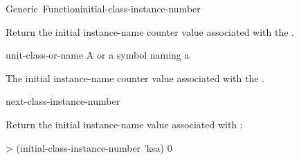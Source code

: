 \documentclass[10pt,twoside,english,pdftex]{article}
\begin{document}
\begin{functiondoc}{Generic~Function}{initial-class-instance-number}%
  { 
    \returns{} }
%
%

\fnsyntax

\fnpurpose Return the initial instance-name counter value associated with the
.

\fnmethods
{}%
  {\code{(} 
  \returns{} } 
%
  {\code{(} 
  \returns{} }

\fnpackage {}

\fnmodule {}

\fnargs
\begin{args}{unit-class-or-name}
 A  or a symbol naming a
\end{args}

\fnreturns The initial instance-name counter value
associated with the .

\begin{alsos}{next-class-instance-number}
\end{alsos}

\fnexamples Return the initial instance-name value associated with
 :
%
\W\supp
\begin{example}
> (initial-class-instance-number 'ksa)
0
\end{example} 

\end{functiondoc}

\end{document}
